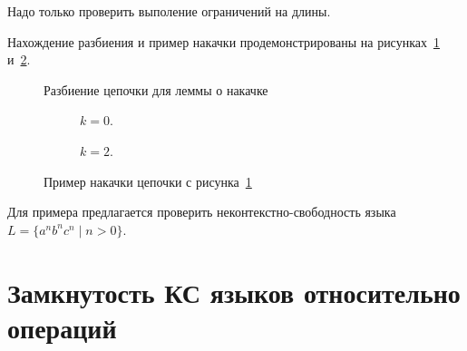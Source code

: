 Надо только проверить выполение ограничений на длины.

Нахождение разбиения и пример накачки продемонстрированы на рисунках~\ref{fig:pumping1} и~\ref{fig:pumping2}.

\begin{figure}
\centering

\caption{Разбиение цепочки для леммы о накачке}
\label{fig:pumping1}
\end{figure}

\begin{figure}
\centering
  \begin{subfigure}[b]{0.4\textwidth}
    \centering
    
    \caption{$k = 0$.}
  \end{subfigure}
\hfill
  \begin{subfigure}[b]{0.4\textwidth}
    \centering
    
    \caption{$k = 2$.}
  \end{subfigure}
\caption{Пример накачки цепочки с рисунка~\ref{fig:pumping1}}
\label{fig:pumping2}
\end{figure}


Для примера предлагается проверить неконтекстно-свободность языка $L=\{a^nb^nc^n \mid n>0\}$.


\section{Замкнутость КС языков относительно операций}


